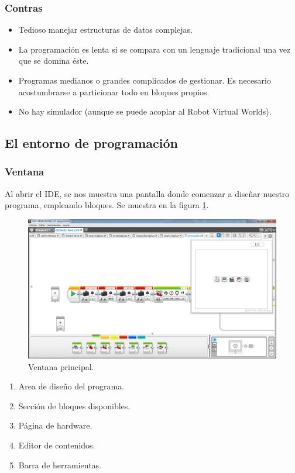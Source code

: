 \documentclass[12pt,a4paper]{article}
\begin{document}
\subsubsection{Contras}
\begin{itemize}
\item Tedioso manejar estructuras de datos complejas.
\item La programación es lenta si se compara con un lenguaje tradicional una vez
que se domina éste.
\item Programas medianos o grandes complicados de gestionar. Es necesario
acostumbrarse a particionar todo en bloques propios.
\item No hay simulador (aunque se puede acoplar al Robot Virtual Worlds).
\end{itemize}

\subsection{El entorno de programación}

\subsubsection{Ventana}
Al abrir el IDE, se nos muestra una pantalla donde comenzar a diseñar nuestro
programa, empleando bloques. Se muestra en la figura \ref{fig:principal}.

\begin{figure}[H]
	\caption{Ventana principal.\label{fig:principal}}
	\includegraphics[width=\linewidth]{Programa.PNG}
	\centering
\end{figure}

\begin{enumerate}
\item Area de diseño del programa.
\item Sección de bloques disponibles.
\item Página de hardware.
\item Editor de contenidos.
\item Barra de herramientas.
\end{enumerate}
\end{document}
